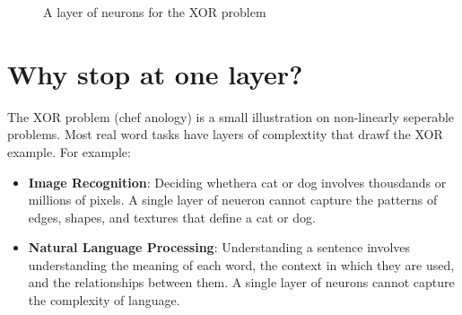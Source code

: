 \documentclass[9pt]{extarticle}
\theoremstyle{plain}
\theoremstyle{definition}
\theoremstyle{remark}
\begin{document}
\begin{figure}[h]
\begin{subfigure}[b]{0.5\textwidth}
    \end{subfigure}
    \caption{A layer of neurons for the XOR problem}
\end{figure}

\section{Why stop at one layer?}
The XOR problem (chef anology) is a small illustration on non-linearly seperable problems. Most real word tasks have layers of complextity that drawf the XOR example. For example:
\begin{itemize}
    \item \textbf{Image Recognition}: Deciding whethera cat or dog involves thousdands or millions of pixels. A single layer of neueron cannot capture the patterns of edges, shapes, and textures that define a cat or dog.
    \item \textbf{Natural Language Processing}: Understanding a sentence involves understanding the meaning of each word, the context in which they are used, and the relationships between them. A single layer of neurons cannot capture the complexity of language.
\end{itemize}
\end{document}
